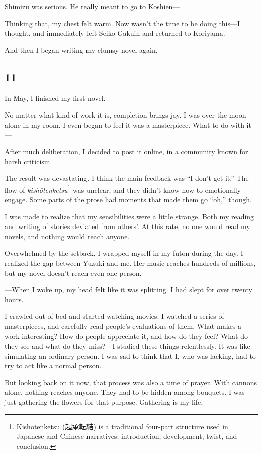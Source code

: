 \documentclass[
    a4paper,
    12pt,
    twoside,
    openany,
    UTF8,
    fontset=windows
]{ctexbook}
\begin{document}
Shimizu was serious. He really meant to go to Koshien---

Thinking that, my chest felt warm. Now wasn't the time to be doing this—I thought, and immediately left Seiko Gakuin and returned to Koriyama.

And then I began writing my clumsy novel again.


\subsection*{11}

In May, I finished my first novel.

No matter what kind of work it is, completion brings joy. I was over the moon alone in my room. I even began to feel it was a masterpiece. What to do with it---

After much deliberation, I decided to post it online, in a community known for harsh criticism.

The result was devastating. I think the main feedback was ``I don't get it.'' The flow of \textit{kishōtenketsu}\footnote{Kishōtenketsu (起承転結) is a traditional four-part structure used in Japanese and Chinese narratives: introduction, development, twist, and conclusion.} was unclear, and they didn't know how to emotionally engage. Some parts of the prose had moments that made them go ``oh,'' though.

I was made to realize that my sensibilities were a little strange. Both my reading and writing of stories deviated from others'. At this rate, no one would read my novels, and nothing would reach anyone.

Overwhelmed by the setback, I wrapped myself in my futon during the day. I realized the gap between Yuzuki and me. Her music reaches hundreds of millions, but my novel doesn't reach even one person.

---When I woke up, my head felt like it was splitting. I had slept for over twenty hours.

I crawled out of bed and started watching movies. I watched a series of masterpieces, and carefully read people's evaluations of them. What makes a work interesting? How do people appreciate it, and how do they feel? What do they see and what do they miss?---I studied these things relentlessly. It was like simulating an ordinary person. I was sad to think that I, who was lacking, had to try to act like a normal person.

But looking back on it now, that process was also a time of prayer. With cannons alone, nothing reaches anyone. They had to be hidden among bouquets. I was just gathering the flowers for that purpose. Gathering is my life.
\end{document}
